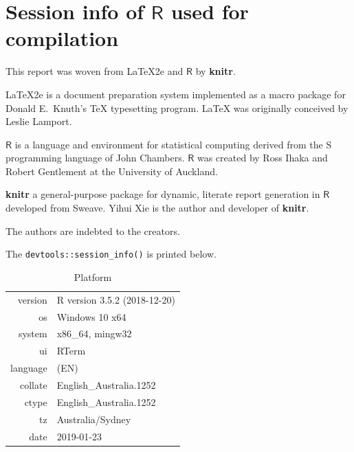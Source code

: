 \documentclass{grattan}\usepackage[]{graphicx}\usepackage[]{color}
\begin{document}
\chapter{Session info of $\mathsf{R}$ used for compilation}
\begin{multicols*}{2}
This report was woven from  \textrm{\LaTeX2e} and $\mathsf{R}$ by \textbf{knitr}. 

\textrm{\LaTeX2e} is a document preparation system implemented as a macro package for Donald E.\ Knuth's \textrm{\TeX} typesetting program. \textrm{\LaTeX} was originally conceived by Leslie Lamport. 

$\mathsf{R}$ is a language and environment for statistical computing derived from the S programming language of John Chambers. $\mathsf{R}$ was created by Ross Ihaka and Robert Gentlement at the University of Auckland. 

\textbf{knitr} a general-purpose package for dynamic, literate report generation in $\mathsf{R}$ developed from Sweave. Yihui Xie is the author and developer of \textbf{knitr}. 

The authors are indebted to the creators.

The \verb=devtools::session_info()= is printed below.
\end{multicols*}


\begin{table}[!htb]
\centering
\caption{Platform}
\begin{tabular}{rl}
  \toprule
 version & R version 3.5.2 (2018-12-20) \\ 
  os & Windows 10 x64 \\ 
  system & x86\_64, mingw32 \\ 
  ui & RTerm \\ 
  language & (EN) \\ 
  collate & English\_Australia.1252 \\ 
  ctype & English\_Australia.1252 \\ 
  tz & Australia/Sydney \\ 
  date & 2019-01-23 \\ 
   \bottomrule
\end{tabular}

\end{table}

\end{document}
